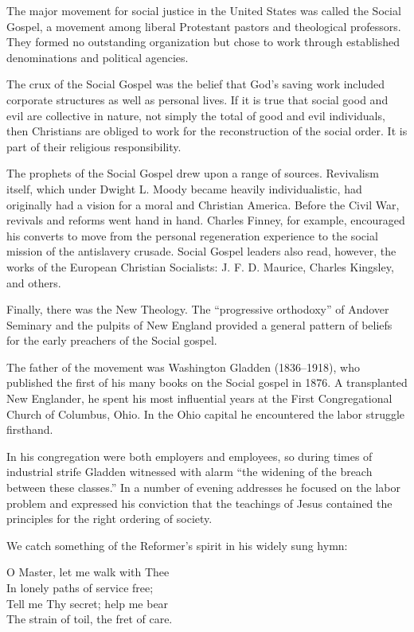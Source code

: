The major movement for social justice in the United States was called the Social Gospel, a movement
among liberal Protestant pastors and theological professors. They formed no outstanding organization
but chose to work through established denominations and political agencies.

The crux of the Social Gospel was the belief that God’s saving work included corporate structures as
well as personal lives. If it is true that social good and evil are collective in nature, not simply
the total of good and evil individuals, then Christians are obliged to work for the reconstruction
of the social order. It is part of their religious responsibility.

The prophets of the Social Gospel drew upon a range of sources. Revivalism itself, which under
Dwight L. Moody became heavily individualistic, had originally had a vision for a moral and
Christian America. Before the Civil War, revivals and reforms went hand in hand. Charles Finney, for
example, encouraged his converts to move from the personal regeneration experience to the social
mission of the antislavery crusade. Social Gospel leaders also read, however, the works of the
European Christian Socialists: J. F. D. Maurice, Charles Kingsley, and others.

Finally, there was the New Theology. The “progressive orthodoxy” of Andover Seminary and the pulpits
of New England provided a general pattern of beliefs for the early preachers of the Social gospel.

The father of the movement was Washington Gladden (1836–1918), who published the first of his many
books on the Social gospel in 1876. A transplanted New Englander, he spent his most influential
years at the First Congregational Church of Columbus, Ohio. In the Ohio capital he encountered the
labor struggle firsthand.

In his congregation were both employers and employees, so during times of industrial strife Gladden
witnessed with alarm “the widening of the breach between these classes.” In a number of evening
addresses he focused on the labor problem and expressed his conviction that the teachings of Jesus
contained the principles for the right ordering of society.

We catch something of the Reformer’s spirit in his widely sung hymn:

\begin{poem}
O Master, let me walk with Thee\\
In lonely paths of service free;\\
Tell me Thy secret; help me bear\\
The strain of toil, the fret of care.
\end{poem}

